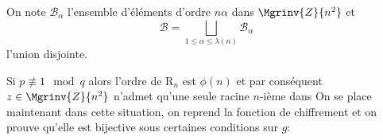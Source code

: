 
	On note $\mathcal{B}_\alpha$ l'ensemble d'éléments d'ordre $n\alpha$ dans $\Mgrinv{Z}{n^2}$  et 
	$$\mathcal{B} = \underset{1\leq \alpha\leq \lambda(n)}{\bigsqcup}{\mathcal{B}_\alpha}$$ l'union disjointe.


	Si $p \not\equiv 1\mod{q}$ alors 
	l'ordre de $\mathrm{R}_n$ est $\phi(n)$ 
	et par conséquent 
	$z \in \Mgrinv{Z}{n^2}$ n'admet qu'une seule racine $n$-ième dans 
	On se place maintenant dans cette situation,
	on reprend la fonction de chiffrement et on prouve qu'elle est bijective sous certaines conditions sur $g$:

